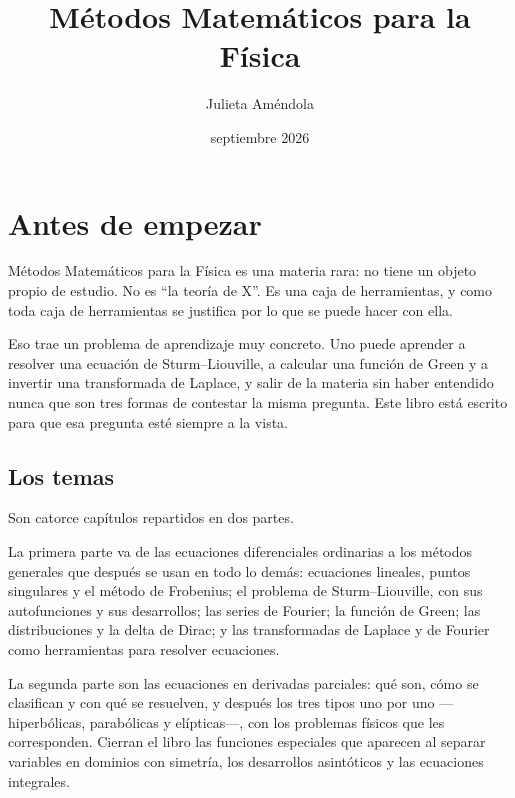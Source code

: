 \documentclass[
  spanish,
  a4paper,
]{scrbook}
\title{Métodos Matemáticos para la Física}
\author{Julieta Améndola}
\date{septiembre 2026}
\renewcommand*\contentsname{Tabla de contenidos}
\newcommand\contentsname{Tabla de contenidos}
\theoremstyle{definition}
\theoremstyle{plain}
\theoremstyle{definition}
\theoremstyle{plain}
\theoremstyle{definition}
\theoremstyle{remark}
\begin{document}
\frontmatter
\maketitle

\renewcommand*\contentsname{Tabla de contenidos}
{
\setcounter{tocdepth}{2}
\tableofcontents
}

\mainmatter
{}

\chapter*{Antes de empezar}\label{antes-de-empezar}


Métodos Matemáticos para la Física es una materia rara: no tiene un
objeto propio de estudio. No es ``la teoría de X''. Es una caja de
herramientas, y como toda caja de herramientas se justifica por lo que
se puede hacer con ella.

Eso trae un problema de aprendizaje muy concreto. Uno puede aprender a
resolver una ecuación de Sturm--Liouville, a calcular una función de
Green y a invertir una transformada de Laplace, y salir de la materia
sin haber entendido nunca que son tres formas de contestar la misma
pregunta. Este libro está escrito para que esa pregunta esté siempre a
la vista.

\section*{Los temas}\label{los-temas}


Son catorce capítulos repartidos en dos partes.

La primera parte va de las ecuaciones diferenciales ordinarias a los
métodos generales que después se usan en todo lo demás: ecuaciones
lineales, puntos singulares y el método de Frobenius; el problema de
Sturm--Liouville, con sus autofunciones y sus desarrollos; las series de
Fourier; la función de Green; las distribuciones y la delta de Dirac; y
las transformadas de Laplace y de Fourier como herramientas para
resolver ecuaciones.

La segunda parte son las ecuaciones en derivadas parciales: qué son,
cómo se clasifican y con qué se resuelven, y después los tres tipos uno
por uno ---hiperbólicas, parabólicas y elípticas---, con los problemas
físicos que les corresponden. Cierran el libro las funciones especiales
que aparecen al separar variables en dominios con simetría, los
desarrollos asintóticos y las ecuaciones integrales.
\end{document}

